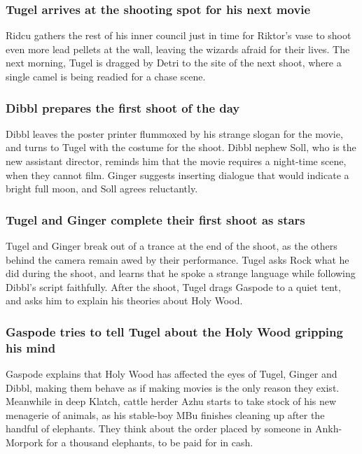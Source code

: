 \subsubsection{\Gls{Tugel} arrives at the shooting spot for his next movie}
\Gls{Ridcu} gathers the rest of his inner council just in time for \Gls{Riktor}'s vase to shoot
even more lead pellets at the wall, leaving the wizards afraid for their lives. The next morning,
\Gls{Tugel} is dragged by \Gls{Detri} to the site of the next shoot, where a single camel is being
readied for a chase scene.

\subsubsection{\Gls{Dibbl} prepares the first shoot of the day}
\Gls{Dibbl} leaves the poster printer flummoxed by his strange slogan for the movie, and turns
to \Gls{Tugel} with the costume for the shoot. \Gls{Dibbl} nephew \Gls{Soll}, who is the new
assistant director, reminds him that the movie requires a night-time scene, when they cannot film.
\Gls{Ginger} suggests inserting dialogue that would indicate a bright full moon, and \Gls{Soll}
agrees reluctantly.

\subsubsection{\Gls{Tugel} and \Gls{Ginger} complete their first shoot as stars}
\Gls{Tugel} and \Gls{Ginger} break out of a trance at the end of the shoot, as the others behind
the camera remain awed by their performance. \Gls{Tugel} asks \Gls{Rock} what he did during the
shoot, and learns that he spoke a strange language while following \Gls{Dibbl}'s script faithfully.
After the shoot, \Gls{Tugel} drags \Gls{Gaspode} to a quiet tent, and asks him to explain his
theories about Holy Wood.

\subsubsection{\Gls{Gaspode} tries to tell \Gls{Tugel} about the Holy Wood gripping his mind}
\Gls{Gaspode} explains that Holy Wood has affected the eyes of \Gls{Tugel}, \Gls{Ginger} and
\Gls{Dibbl}, making them behave as if making movies is the only reason they exist. Meanwhile in
deep Klatch, cattle herder \Gls{Azhu} starts to take stock of his new menagerie of animals, as
his stable-boy \Gls{MBu} finishes cleaning up after the handful of elephants. They think about the
order placed by someone in Ankh-Morpork for a thousand elephants, to be paid for in cash.

